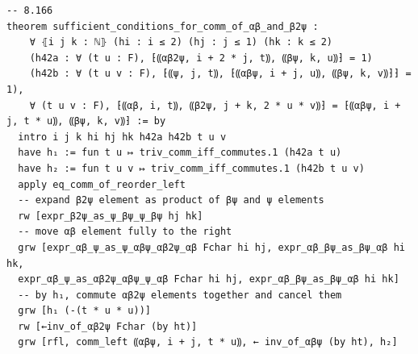 \documentclass[10pt,a4paper]{article}
\begin{document}
\begin{Verbatim}
-- 8.166
theorem sufficient_conditions_for_comm_of_αβ_and_β2ψ :
    ∀ ⦃i j k : ℕ⦄ (hi : i ≤ 2) (hj : j ≤ 1) (hk : k ≤ 2)
    (h42a : ∀ (t u : F), ⁅⸨αβ2ψ, i + 2 * j, t⸩, ⸨βψ, k, u⸩⁆ = 1)
    (h42b : ∀ (t u v : F), ⁅⸨ψ, j, t⸩, ⁅⸨αβψ, i + j, u⸩, ⸨βψ, k, v⸩⁆⁆ = 1),
    ∀ (t u v : F), ⁅⸨αβ, i, t⸩, ⸨β2ψ, j + k, 2 * u * v⸩⁆ = ⁅⸨αβψ, i + j, t * u⸩, ⸨βψ, k, v⸩⁆ := by
  intro i j k hi hj hk h42a h42b t u v
  have h₁ := fun t u ↦ triv_comm_iff_commutes.1 (h42a t u)
  have h₂ := fun t u v ↦ triv_comm_iff_commutes.1 (h42b t u v)
  apply eq_comm_of_reorder_left
  -- expand β2ψ element as product of βψ and ψ elements
  rw [expr_β2ψ_as_ψ_βψ_ψ_βψ hj hk]
  -- move αβ element fully to the right
  grw [expr_αβ_ψ_as_ψ_αβψ_αβ2ψ_αβ Fchar hi hj, expr_αβ_βψ_as_βψ_αβ hi hk,
  expr_αβ_ψ_as_αβ2ψ_αβψ_ψ_αβ Fchar hi hj, expr_αβ_βψ_as_βψ_αβ hi hk]
  -- by h₁, commute αβ2ψ elements together and cancel them
  grw [h₁ (-(t * u * u))]
  rw [←inv_of_αβ2ψ Fchar (by ht)]
  grw [rfl, comm_left ⸨αβψ, i + j, t * u⸩, ← inv_of_αβψ (by ht), h₂]


\end{Verbatim}
\end{document}
